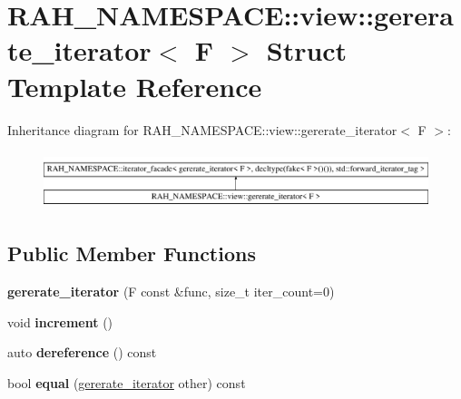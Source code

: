 \hypertarget{struct_r_a_h___n_a_m_e_s_p_a_c_e_1_1view_1_1gererate__iterator}{}\section{R\+A\+H\+\_\+\+N\+A\+M\+E\+S\+P\+A\+CE\+::view\+::gererate\+\_\+iterator$<$ F $>$ Struct Template Reference}
\label{struct_r_a_h___n_a_m_e_s_p_a_c_e_1_1view_1_1gererate__iterator}
Inheritance diagram for R\+A\+H\+\_\+\+N\+A\+M\+E\+S\+P\+A\+CE\+::view\+::gererate\+\_\+iterator$<$ F $>$\+:\begin{figure}[H]
\begin{center}
\leavevmode
\includegraphics[height=1.702128cm]{struct_r_a_h___n_a_m_e_s_p_a_c_e_1_1view_1_1gererate__iterator}
\end{center}
\end{figure}
\subsection*{Public Member Functions}
\begin{DoxyCompactItemize}
\item 
\mbox{\label{struct_r_a_h___n_a_m_e_s_p_a_c_e_1_1view_1_1gererate__iterator_ac3dfab3685227633f4f80802e5c81e8e}} 
{\bfseries gererate\+\_\+iterator} (F const \&func, size\+\_\+t iter\+\_\+count=0)
\item 
\mbox{\label{struct_r_a_h___n_a_m_e_s_p_a_c_e_1_1view_1_1gererate__iterator_acca8608ec371b7896af8df15127496fc}} 
void {\bfseries increment} ()
\item 
\mbox{\label{struct_r_a_h___n_a_m_e_s_p_a_c_e_1_1view_1_1gererate__iterator_ad68f1e87c422d156a4f8273fec7d51d4}} 
auto {\bfseries dereference} () const
\item 
\mbox{\label{struct_r_a_h___n_a_m_e_s_p_a_c_e_1_1view_1_1gererate__iterator_a32ab267b423d43bd1baf21a57ff2949d}} 
bool {\bfseries equal} (\mbox{\hyperlink{struct_r_a_h___n_a_m_e_s_p_a_c_e_1_1view_1_1gererate__iterator}{gererate\+\_\+iterator}} other) const
\end{DoxyCompactItemize}

